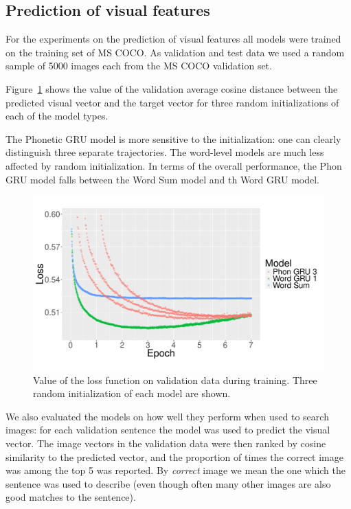\subsection{Prediction of visual features}
\label{subsec:visual}
For the experiments on the prediction of visual features all models
were trained on the training set of MS COCO. As validation and test data we
used a random sample of 5000 images each from the MS COCO validation set. 

Figure~\ref{fig:loss} shows the value of the validation average cosine distance
between the predicted visual vector and the target vector for three
random initializations of each of the model types. 

The Phonetic GRU model is more sensitive to the initialization: one
can clearly distinguish three separate trajectories. The word-level models
are much less affected by random initialization. In terms of the
overall performance, the {\sc Phon GRU} model falls between the
{\sc Word Sum} model and th {\sc Word GRU} model.

\begin{figure}
  \centering
  \includegraphics[scale=0.3]{loss-zoom.pdf}
  \caption{Value of the loss function on validation data during
    training. Three random initialization of each model are shown.}
  \label{fig:loss}
\end{figure}

We also evaluated the models on how well they perform when used to
search images: for each validation sentence the model was used to predict the
visual vector. The image vectors in the validation data were then
ranked by cosine similarity to the predicted vector, and the
proportion of times the correct image was among the top 5 was
reported. By {\it correct} image we mean the one which the sentence
was used to describe (even though often many other images are also
good matches to the sentence). 

